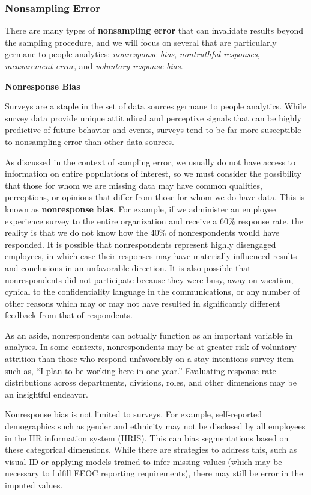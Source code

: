 \documentclass[
]{book}
\begin{document}
\hypertarget{nonsampling-error}{%
\subsubsection{Nonsampling Error}\label{nonsampling-error}}

There are many types of \textbf{nonsampling error} that can invalidate results beyond the sampling procedure, and we will focus on several that are particularly germane to people analytics: \emph{nonresponse bias}, \emph{nontruthful responses}, \emph{measurement error}, and \emph{voluntary response bias}.

\textbf{Nonresponse Bias}

Surveys are a staple in the set of data sources germane to people analytics. While survey data provide unique attitudinal and perceptive signals that can be highly predictive of future behavior and events, surveys tend to be far more susceptible to nonsampling error than other data sources.

As discussed in the context of sampling error, we usually do not have access to information on entire populations of interest, so we must consider the possibility that those for whom we are missing data may have common qualities, perceptions, or opinions that differ from those for whom we do have data. This is known as \textbf{nonresponse bias}. For example, if we administer an employee experience survey to the entire organization and receive a 60\% response rate, the reality is that we do not know how the 40\% of nonrespondents would have responded. It is possible that nonrespondents represent highly disengaged employees, in which case their responses may have materially influenced results and conclusions in an unfavorable direction. It is also possible that nonrespondents did not participate because they were busy, away on vacation, cynical to the confidentiality language in the communications, or any number of other reasons which may or may not have resulted in significantly different feedback from that of respondents.

As an aside, nonrespondents can actually function as an important variable in analyses. In some contexts, nonrespondents may be at greater risk of voluntary attrition than those who respond unfavorably on a stay intentions survey item such as, ``I plan to be working here in one year.'' Evaluating response rate distributions across departments, divisions, roles, and other dimensions may be an insightful endeavor.

Nonresponse bias is not limited to surveys. For example, self-reported demographics such as gender and ethnicity may not be disclosed by all employees in the HR information system (HRIS). This can bias segmentations based on these categorical dimensions. While there are strategies to address this, such as visual ID or applying models trained to infer missing values (which may be necessary to fulfill EEOC reporting requirements), there may still be error in the imputed values.
\end{document}
